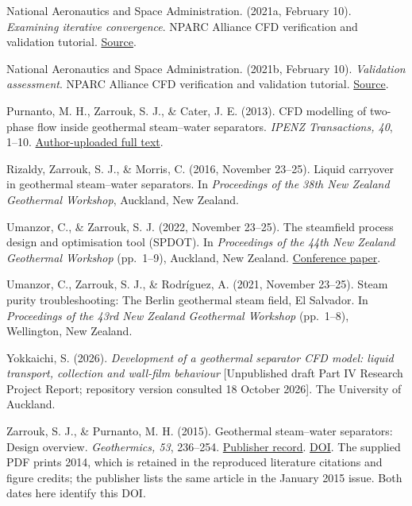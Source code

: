 National Aeronautics and Space Administration. (2021a, February 10). \emph{Examining iterative convergence}. NPARC Alliance CFD verification and validation tutorial. \href{https://www.grc.nasa.gov/www/wind/valid/tutorial/iterconv.html}{Source}.

National Aeronautics and Space Administration. (2021b, February 10). \emph{Validation assessment}. NPARC Alliance CFD verification and validation tutorial. \href{https://www.grc.nasa.gov/www/wind/valid/tutorial/valassess.html}{Source}.

Purnanto, M. H., Zarrouk, S. J., \& Cater, J. E. (2013). CFD modelling of two-phase flow inside geothermal steam--water separators. \emph{IPENZ Transactions, 40}, 1--10. \href{https://www.researchgate.net/publication/269519626_CFD_MODELLING_OF_TWO-PHASE_FLOW_INSIDE_GEOTHERMAL_STEAM-WATER_SEPARATORS}{Author-uploaded full text}.

Rizaldy, Zarrouk, S. J., \& Morris, C. (2016, November 23--25). Liquid carryover in geothermal steam--water separators. In \emph{Proceedings of the 38th New Zealand Geothermal Workshop}, Auckland, New Zealand.

Umanzor, C., \& Zarrouk, S. J. (2022, November 23--25). The steamfield process design and optimisation tool (SPDOT). In \emph{Proceedings of the 44th New Zealand Geothermal Workshop} (pp.~1--9), Auckland, New Zealand. \href{https://www.worldgeothermal.org/pdf/IGAstandard/NZGW/2022/053.pdf}{Conference paper}.

Umanzor, C., Zarrouk, S. J., \& Rodríguez, A. (2021, November 23--25). Steam purity troubleshooting: The Berlin geothermal steam field, El Salvador. In \emph{Proceedings of the 43rd New Zealand Geothermal Workshop} (pp.~1--8), Wellington, New Zealand.

Yokkaichi, S. (2026). \emph{Development of a geothermal separator CFD model: liquid transport, collection and wall-film behaviour} {[}Unpublished draft Part IV Research Project Report; repository version consulted 18 October 2026{]}. The University of Auckland.

Zarrouk, S. J., \& Purnanto, M. H. (2015). Geothermal steam--water separators: Design overview. \emph{Geothermics, 53}, 236--254. \href{https://www.sciencedirect.com/science/article/abs/pii/S0375650514000637}{Publisher record}. \href{https://doi.org/10.1016/j.geothermics.2014.05.009}{DOI}. The supplied PDF prints 2014, which is retained in the reproduced literature citations and figure credits; the publisher lists the same article in the January 2015 issue. Both dates here identify this DOI.
